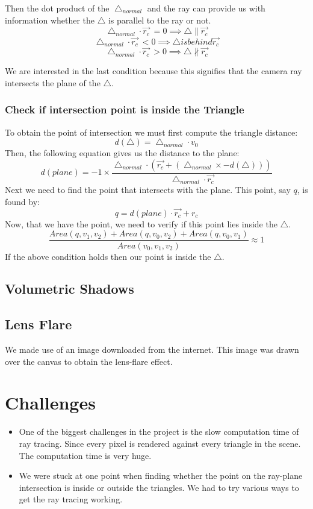 \documentclass[paper=a4, fontsize=11pt]{scrartcl}
\numberwithin{equation}{section}		%
\numberwithin{figure}{section}			%
\numberwithin{table}{section}				%
\begin{document}
Then the dot product of the $\bigtriangleup _{normal}$ and the ray can provide us with information whether the $\bigtriangleup$ is parallel to the ray or not.
\[ \bigtriangleup _{normal} \cdot \overrightarrow{r_{c}}\ = 0 \implies \bigtriangleup \parallel \overrightarrow{r_{c}}\]
\[ \bigtriangleup _{normal} \cdot \overrightarrow{r_{c}}\ < 0 \implies \bigtriangleup is behind \overrightarrow{r_{c}}\]
\[ \bigtriangleup _{normal} \cdot \overrightarrow{r_{c}}\ > 0 \implies \bigtriangleup  \not\parallel \overrightarrow{r_{c}}\]

We are interested in the last condition because this signifies that the camera ray intersects the plane of the $\bigtriangleup$.

\subsubsection{Check if intersection point is inside the Triangle}
To obtain the point of intersection we must first compute the triangle distance:
\[d(\bigtriangleup) = \bigtriangleup_{normal} \cdot v_{0}\]
Then, the following equation gives us the distance to the plane:
\[d(plane) = -1 \times \dfrac{\bigtriangleup_{normal} \cdot (\overrightarrow{r_{c}} + (\bigtriangleup_{normal} \times -d(\bigtriangleup)))}{\bigtriangleup_{normal}\cdot \overrightarrow{r_{c}}}  \]
Next we need to find the point that intersects with the plane.
This point, say $q$, is found by:
\[q = d(plane)\cdot\overrightarrow{r_{c}} + r_{c}\]
Now, that we have the point, we need to verify if this point lies inside the $\bigtriangleup$.
\[\dfrac{Area(q, v_{1}, v_{2}) + Area(q, v_{0}, v_{2}) + Area(q, v_{0}, v_{1})}{Area(v_{0}, v_{1}, v_{2})} \approx 1\]
If the above condition holds then our point is inside the $\bigtriangleup$.

\subsection{Volumetric Shadows}

\subsection{Lens Flare}
We made use of an image downloaded from the internet. This image was drawn over the canvas to obtain the lens-flare effect.
\section{Challenges}
\begin{itemize}
\item One of the biggest challenges in the project is the slow computation time of ray tracing. Since every pixel is rendered against every triangle in the scene. The computation time is very huge.
\item We were stuck at one point when finding whether the point on the ray-plane intersection is inside or outside the triangles. We had to try various ways to get the ray tracing working.
\end{itemize}
\end{document}
